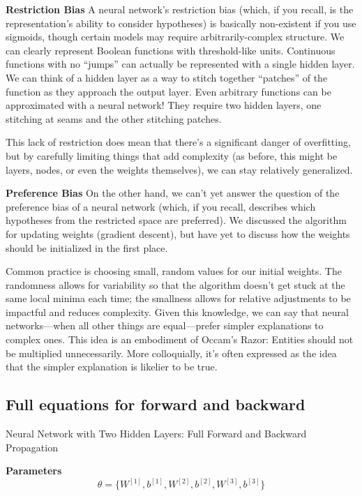 \documentclass[12pt]{report}
\begin{document}
\textbf{Restriction Bias} A neural network’s restriction bias (which, if you recall, is the representation’s ability to consider hypotheses) is basically non-existent if you use sigmoids, though certain models may require arbitrarily-complex structure. We can clearly represent Boolean functions with threshold-like units. Continuous functions with no “jumps” can actually be represented with a single hidden layer. We can think of a hidden layer as a way to stitch together “patches” of the function as they approach the output layer. Even arbitrary functions can be approximated with a neural network! They require two hidden layers, one stitching at seams and the other stitching patches.

This lack of restriction does mean that there’s a significant danger of overfitting, but by carefully limiting things that add complexity (as before, this might be layers, nodes, or even the weights themselves), we can stay relatively generalized.


\textbf{Preference Bias} On the other hand, we can’t yet answer the question of the preference bias of a neural network (which, if you recall, describes which hypotheses from
the restricted space are preferred). We discussed the algorithm for updating weights
(gradient descent), but have yet to discuss how the weights should be initialized in the first place.

Common practice is choosing small, random values for our initial weights. The randomness allows for variability so that the algorithm doesn’t get stuck at the same local minima each time; the smallness allows for relative adjustments to be impactful and reduces complexity. Given this knowledge, we can say that neural networks—when all other things are equal—prefer simpler explanations to complex ones. This idea is an embodiment of Occam’s Razor: Entities should not be multiplied unnecessarily. More colloquially, it’s often expressed as the idea that the simpler explanation is likelier to be true.

\subsection{Full equations for forward and backward}

Neural Network with Two Hidden Layers: Full Forward and Backward Propagation

\textbf{Parameters}
\[
\theta = \{W^{[1]}, b^{[1]}, W^{[2]}, b^{[2]}, W^{[3]}, b^{[3]}\}
\]

\end{document}
